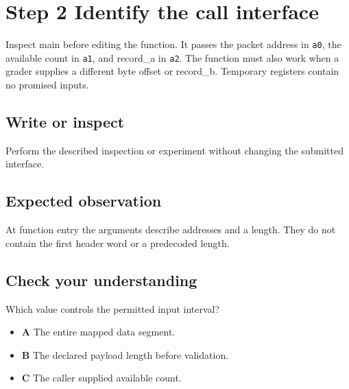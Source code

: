 \section{Step 2 Identify the call interface}\label{packet-s02}

Inspect main before editing the function. It passes the packet address in \texttt{a0}, the available count in \texttt{a1}, and record\_a in \texttt{a2}. The function must also work when a grader supplies a different byte offset or record\_b. Temporary registers contain no promised inputs.

\subsection{Write or inspect}
Perform the described inspection or experiment without changing the submitted interface.

\subsection{Expected observation}
At function entry the arguments describe addresses and a length. They do not contain the first header word or a predecoded length.

\subsection{Check your understanding}
Which value controls the permitted input interval?

\begin{itemize}
  \item \textbf{A} The entire mapped data segment.
  \item \textbf{B} The declared payload length before validation.
  \item \textbf{C} The caller supplied available count.
\end{itemize}
